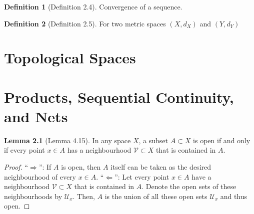 \documentclass[a4paper]{book}
\theoremstyle{definition}
\newtheorem{definition}{Definition}[]
\newtheorem{lemma}[definition]{Lemma}
\begin{document}
\begin{defbox}
    \begin{definition}[Definition 2.4]
        Convergence of a sequence.
    \end{definition}
\end{defbox}

\begin{defbox}
    \begin{definition}[Definition 2.5]
        For two metric spaces \((X, d_X)\) and \((Y, d_Y)\)
    \end{definition}
\end{defbox}

\chapter{Topological Spaces}
\chapter{Products, Sequential Continuity, and Nets}

\begin{thmbox}
    \begin{lemma}[Lemma 4.15]
        In any space \(X\), a subset \(A \subset X\) is open if and only if every point \(x \in A\) has a neighbourhood \(\mathcal{V} \subset X\) that is contained in \(A\).
    \end{lemma}
\end{thmbox}
\begin{proof}
    ``\(\Rightarrow\)'': If \(A\) is open, then \(A\) itself can be taken as the desired neighbourhood of every \(x \in A\).
    ``\(\Leftarrow\)'': Let every point \(x \in A\) have a neighbourhood \(\mathcal{V} \subset X\) that is contained in \(A\). Denote the open sets of these neighbourhoods by \(\mathcal{U}_x\). Then, \(A\) is the union of all these open sets \(\mathcal{U}_x\) and thus open.
\end{proof}
\end{document}
